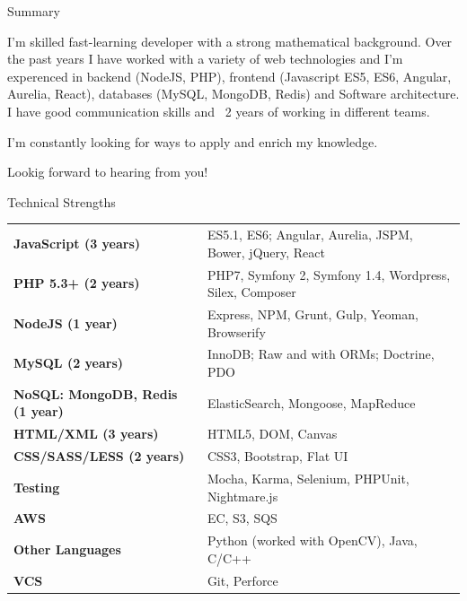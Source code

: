 \documentclass{resume} %
\begin{document}

\begin{rSection}{Summary}

I'm skilled fast-learning developer with a strong mathematical background. Over the past years I have worked with a variety of web technologies and I'm experenced in backend (NodeJS, PHP), frontend (Javascript ES5, ES6, Angular, Aurelia, React), databases (MySQL, MongoDB, Redis) and Software architecture. I have good communication skills and ~2 years of working in different teams.

I'm constantly looking for ways to apply and enrich my knowledge. 

Lookig forward to hearing from you!

\end{rSection}



\begin{rSection}{Technical Strengths}

\begin{tabular}{ @{} >{\bfseries}l @{\hspace{6ex}} l }
JavaScript (3 years) & ES5.1, ES6; Angular, Aurelia, JSPM, Bower, jQuery, React \\
PHP 5.3+ (2 years) & PHP7, Symfony 2, Symfony 1.4, Wordpress, Silex, Composer \\
NodeJS (1 year) & Express, NPM, Grunt, Gulp, Yeoman, Browserify \\
MySQL (2 years) & InnoDB; Raw and with ORMs; Doctrine, PDO \\
NoSQL: MongoDB, Redis (1 year) & ElasticSearch, Mongoose, MapReduce \\
HTML/XML (3 years) & HTML5, DOM, Canvas \\
CSS/SASS/LESS (2 years) & CSS3, Bootstrap, Flat UI \\
Testing & Mocha, Karma, Selenium, PHPUnit, Nightmare.js \\
AWS & EC, S3, SQS  \\
Other Languages & Python (worked with OpenCV), Java, C/C++ \\
VCS & Git, Perforce \\
\end{tabular}

\end{rSection}
\end{document}
